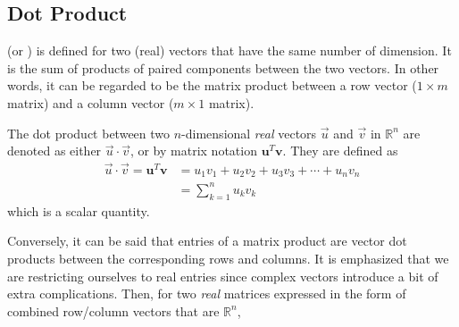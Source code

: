 \subsection{Dot Product}
\label{section:dotprod}
 (or ) is defined for two (real) vectors that have the same number of dimension. It is the sum of products of paired components between the two vectors. In other words, it can be regarded to be the matrix product between a row vector ($1 \times m$ matrix) and a column vector ($m \times 1$ matrix). 
\begin{defn}
\label{defn:dotreal}
The dot product between two $n$-dimensional \textit{real} vectors $\vec{u}$ and $\vec{v}$ in $\mathbb{R}^n$ are denoted as either $\vec{u} \cdot \vec{v}$, or by matrix notation $\textbf{u}^T\textbf{v}$. They are defined as
\begin{align*}
\vec{u} \cdot \vec{v} = \textbf{u}^T\textbf{v} &= u_1v_1 + u_2v_2 + u_3v_3 + \cdots + u_nv_n \\
&= \sum_{k=1}^{n} u_kv_k
\end{align*}
which is a scalar quantity.
\end{defn}
Conversely, it can be said that entries of a matrix product are vector dot products between the corresponding rows and columns. It is emphasized that we are restricting ourselves to real entries since complex vectors introduce a bit of extra complications. Then, for two \textit{real} matrices expressed in the form of combined row/column vectors that are $\mathbb{R}^n$,
